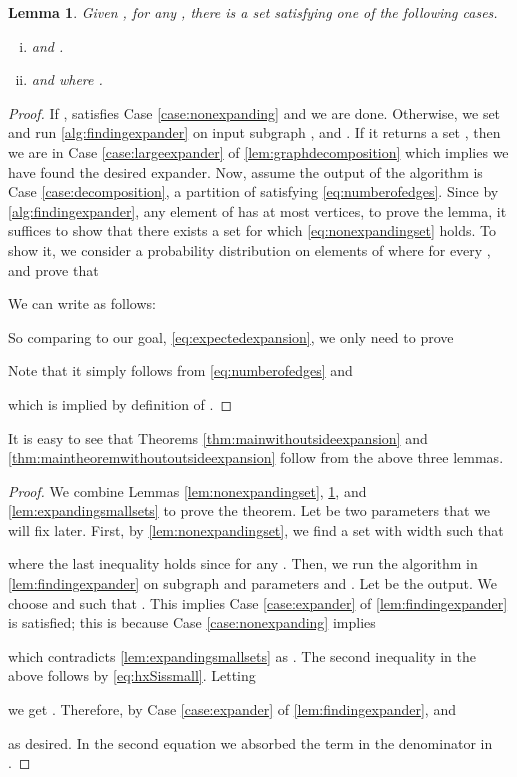 \documentclass[11pt]{article}
\newtheorem{lemma}{Lemma}[section]
\begin{document}
\begin{lemma}
\label{lem:findingexpander}
Given , for any , there is a set  satisfying one of the following cases. 
\begin{enumerate}[i)]
\item \label{case:expander}  and .
\item \label{case:nonexpanding}  and   
where . 
\end{enumerate}
\end{lemma}

\begin{proof}
If ,  satisfies Case \ref{case:nonexpanding} and we are done. Otherwise, we set  and run  \autoref{alg:findingexpander} on input subgraph ,  and . If it returns a set , then we are in Case \ref{case:largeexpander} of  \autoref{lem:graphdecomposition} which implies we have found the desired expander. Now, assume the output of the algorithm is Case 
\ref{case:decomposition}, a partition  of  satisfying \eqref{eq:numberofedges}. Since by 
 \autoref{alg:findingexpander}, any element of  has at 
most  vertices, to prove the lemma, it suffices to 
show that there exists a set  for which \eqref{eq:nonexpandingset} holds. To show it, we consider a probability distribution on elements of  where for every ,  and prove that 
 
We can write  as follows: 

So comparing to our goal, \eqref{eq:expectedexpansion}, we only need to prove 

Note that it simply follows from \eqref{eq:numberofedges} and 

which is implied by definition of .
\end{proof} 
It is easy to see that Theorems \ref{thm:mainwithoutsideexpansion} and \ref{thm:maintheoremwithoutoutsideexpansion} follow from the above three lemmas. 

\mainthm*
\begin{proof}We combine Lemmas \ref{lem:nonexpandingset}, \ref{lem:findingexpander}, and \ref{lem:expandingsmallsets} to prove the theorem. Let  be two parameters that we will fix later. First, by  \autoref{lem:nonexpandingset}, we find a set 
 with width  such that 

where the last 
inequality holds since  for any . Then, we run the algorithm in  
\autoref{lem:findingexpander} 
on subgraph  and parameters  and . Let  be the  output. We choose  and 
 such that . 
This implies  Case 
\ref{case:expander} of  \autoref{lem:findingexpander} is satisfied; this is because Case \ref{case:nonexpanding} implies 

 which contradicts  \autoref{lem:expandingsmallsets} as . The second inequality in the above follows by \eqref{eq:hxSissmall}. Letting

we get .
Therefore, by Case \ref{case:expander} of \autoref{lem:findingexpander},  and 

as desired. In the second equation we absorbed the term  in the denominator in .
\end{proof}
\end{document}
